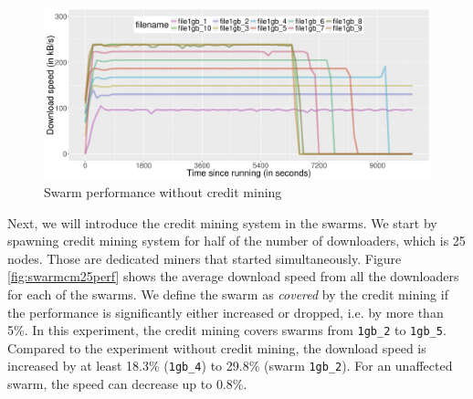 \begin{figure}[h]
	\centering
	\includegraphics[width=\textwidth]{pics/results/swperf_n2.png}
	\caption{Swarm performance without credit mining}
	\label{fig:swarmnocmperf}
\end{figure}


Next, we will introduce the credit mining system in the swarms. We start by spawning credit mining system for half of the number of downloaders, which is 25 nodes. Those are dedicated miners that started simultaneously. Figure \ref{fig:swarmcm25perf} shows the average download speed from all the downloaders for each of the swarms. We define the swarm as \textit{covered} by the credit mining if the performance is significantly either increased or dropped, i.e. by more than 5\%. In this experiment, the credit mining covers swarms from \texttt{1gb\_2} to \texttt{1gb\_5}. Compared to the experiment without credit mining, the download speed is increased by at least 18.3\% (\texttt{1gb\_4}) to 29.8\% (swarm \texttt{1gb\_2}). For an unaffected swarm, the speed can decrease up to 0.8\%.

